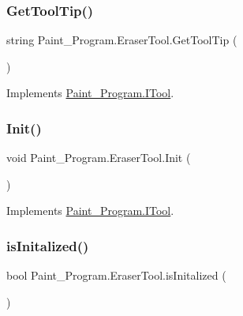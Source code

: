 \subsubsection{\texorpdfstring{Get\+Tool\+Tip()}{GetToolTip()}}
{\footnotesize\ttfamily string Paint\+\_\+\+Program.\+Eraser\+Tool.\+Get\+Tool\+Tip (\begin{DoxyParamCaption}{ }\end{DoxyParamCaption})\hspace{0.3cm}{\ttfamily [inline]}}



Implements \mbox{\hyperlink{interface_paint___program_1_1_i_tool_ac11f1591587144b6e74f5767bbf1df56}{Paint\+\_\+\+Program.\+I\+Tool}}.

\mbox{\label{class_paint___program_1_1_eraser_tool_ac19c1e6bfa1b51a384f1f9b1eaa0b2ea}} 
\subsubsection{\texorpdfstring{Init()}{Init()}}
{\footnotesize\ttfamily void Paint\+\_\+\+Program.\+Eraser\+Tool.\+Init (\begin{DoxyParamCaption}{ }\end{DoxyParamCaption})\hspace{0.3cm}{\ttfamily [inline]}}



Implements \mbox{\hyperlink{interface_paint___program_1_1_i_tool_af823123a30fbda34e24e907243241046}{Paint\+\_\+\+Program.\+I\+Tool}}.

\mbox{\label{class_paint___program_1_1_eraser_tool_a4093d09a604ab0f535497b64447a0013}} 
\subsubsection{\texorpdfstring{is\+Initalized()}{isInitalized()}}
{\footnotesize\ttfamily bool Paint\+\_\+\+Program.\+Eraser\+Tool.\+is\+Initalized (\begin{DoxyParamCaption}{ }\end{DoxyParamCaption})\hspace{0.3cm}{\ttfamily [inline]}}



